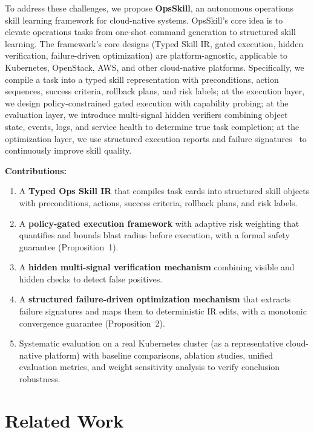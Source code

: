 \documentclass[conference,10pt]{IEEEtran}
\begin{document}
To address these challenges, we propose \textbf{OpsSkill}, an autonomous operations skill learning framework for cloud-native systems.
OpsSkill's core idea is to elevate operations tasks from one-shot command generation to structured skill learning.
The framework's core designs (Typed Skill IR, gated execution, hidden verification, failure-driven optimization) are platform-agnostic, applicable to Kubernetes, OpenStack, AWS, and other cloud-native platforms.
Specifically, we compile a task into a typed skill representation with preconditions, action sequences, success criteria, rollback plans, and risk labels; at the execution layer, we design policy-constrained gated execution with capability probing; at the evaluation layer, we introduce multi-signal hidden verifiers combining object state, events, logs, and service health to determine true task completion; at the optimization layer, we use structured execution reports and failure signatures~\cite{shinn2023reflexion} to continuously improve skill quality.

\noindent\textbf{Contributions:}
\begin{enumerate}
  \item A \textbf{Typed Ops Skill IR} that compiles task cards into structured skill objects with preconditions, actions, success criteria, rollback plans, and risk labels.
  \item A \textbf{policy-gated execution framework} with adaptive risk weighting that quantifies and bounds blast radius before execution, with a formal safety guarantee (Proposition~1).
  \item A \textbf{hidden multi-signal verification mechanism} combining visible and hidden checks to detect false positives.
  \item A \textbf{structured failure-driven optimization mechanism} that extracts failure signatures and maps them to deterministic IR edits, with a monotonic convergence guarantee (Proposition~2).
  \item Systematic evaluation on a real Kubernetes cluster (as a representative cloud-native platform) with baseline comparisons, ablation studies, unified evaluation metrics, and weight sensitivity analysis to verify conclusion robustness.
\end{enumerate}

\section{Related Work}
\end{document}
